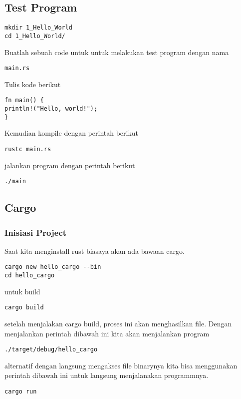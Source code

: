 \documentclass[11pt]{article}
\begin{document}
\subsection{Test Program}
\label{sec:org9ac4130}
\begin{verbatim}
mkdir 1_Hello_World
cd 1_Hello_World/
\end{verbatim}
Buatlah sebuah code untuk untuk melakukan test program dengan nama
\begin{verbatim}
main.rs
\end{verbatim}
Tulis kode berikut
\begin{verbatim}
fn main() {
println!("Hello, world!");
}
\end{verbatim}
Kemudian kompile dengan perintah berikut
\begin{verbatim}
rustc main.rs
\end{verbatim}
jalankan program dengan perintah berikut
\begin{verbatim}
./main
\end{verbatim}

\subsection{Cargo}
\label{sec:org4b7d541}
\subsubsection{Inisiasi Project}
\label{sec:org37593b1}
Saat kita menginstall rust biasaya akan ada bawaan cargo.

\begin{verbatim}
cargo new hello_cargo --bin
cd hello_cargo
\end{verbatim}
untuk build
\begin{verbatim}
cargo build
\end{verbatim}
setelah menjalakan cargo build, proses ini akan menghasilkan
file. Dengan menjalankan perintah dibawah ini kita akan menjalankan program
\begin{verbatim}
./target/debug/hello_cargo 
\end{verbatim}
alternatif dengan langsung mengakses file binarynya kita bisa menggunakan
perintah dibawah ini untuk langsung menjalanakan programmnya.
\begin{verbatim}
cargo run
\end{verbatim}
\end{document}
